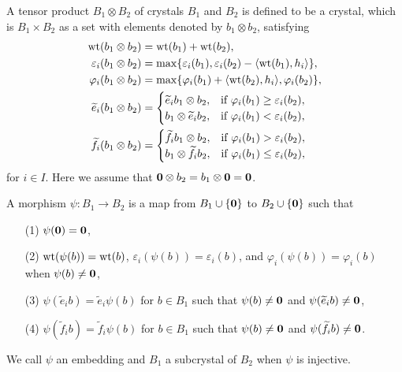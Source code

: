 \documentclass[leqno,11pt]{amsart}
\numberwithin{equation}{section}
\newcommand{\te}{\widetilde{e}}
\newcommand{\tf}{\widetilde{f}}
\begin{document}
A  tensor product $B_1\otimes B_2$  of crystals $B_1$ and $B_2$
is defined to be a crystal, which is $B_1\times B_2$  as a set with elements  denoted by
$b_1\otimes b_2$, satisfying  {\allowdisplaybreaks
\begin{align*}
{\rm wt}(b_1\otimes b_2)&={\rm wt}(b_1)+{\rm wt}(b_2), \\
\varepsilon_i(b_1\otimes b_2)&= {\rm
max}\{\varepsilon_i(b_1),\varepsilon_i(b_2)-\langle {\rm
wt}(b_1),h_i\rangle\}, \\
\varphi_i(b_1\otimes b_2)&= {\rm max}\{\varphi_i(b_1)+\langle {\rm
wt}(b_2),h_i\rangle,\varphi_i(b_2)\},\\
{\te}_i(b_1\otimes b_2)&=
\begin{cases}
{\te}_i b_1 \otimes b_2, & \text{if $\varphi_i(b_1)\geq \varepsilon_i(b_2)$}, \\
b_1\otimes {\te}_i b_2, & \text{if
$\varphi_i(b_1)<\varepsilon_i(b_2)$},
\end{cases}\\
{\tf}_i(b_1\otimes b_2)&=
\begin{cases}
{\tf}_i b_1 \otimes b_2, & \text{if  $\varphi_i(b_1)>\varepsilon_i(b_2)$}, \\
b_1\otimes {\tf}_i b_2, & \text{if $\varphi_i(b_1)\leq
\varepsilon_i(b_2)$},
\end{cases}
\end{align*}
\noindent for $i\in I$. Here we assume that ${\bf 0}\otimes
b_2=b_1\otimes {\bf 0}={\bf 0}$.}

A morphism
$\psi : B_1 \rightarrow B_2$ is a map from $B_1\cup\{{\bf 0}\}$ to
$B_2\cup\{{\bf 0}\}$ such that
\begin{itemize}
\item[(1)] $\psi(\bf{0})=\bf{0}$,

\item[(2)] ${\rm wt}(\psi(b))={\rm wt}(b)$,
$\varepsilon_i(\psi(b))=\varepsilon_i(b)$, and
$\varphi_i(\psi(b))=\varphi_i(b)$ when $\psi(b)\neq \bf{0}$,

\item[(3)] $\psi(\te_i b)=\te_i\psi(b)$ for $b\in B_1$ such that $\psi(b)\neq \bf{0}$ and
$\psi(\te_i b)\neq \bf{0}$,

\item[(4)] $\psi(\tf_i
b)=\tf_i\psi(b)$ for $b\in B_1$ such that $\psi(b)\neq \bf{0}$ and
$\psi(\tf_i b)\neq \bf{0}$.
\end{itemize}
We call $\psi$ an embedding and $B_1$ a subcrystal of
$B_2$ when $\psi$ is injective.
\end{document}

